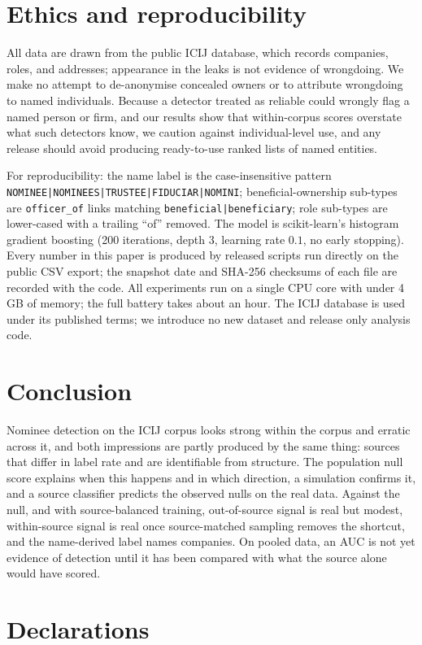 \documentclass[11pt]{article}
\begin{document}
\section{Ethics and reproducibility}
All data are drawn from the public ICIJ database, which records companies, roles,
and addresses; appearance in the leaks is not evidence of wrongdoing. We make no
attempt to de-anonymise concealed owners or to attribute wrongdoing to named
individuals. Because a detector treated as reliable could wrongly flag a named
person or firm, and our results show that within-corpus scores overstate what
such detectors know, we caution against individual-level use, and any release
should avoid producing ready-to-use ranked lists of named entities.

For reproducibility: the name label is the case-insensitive pattern
\texttt{NOMINEE|NOMINEES|TRUSTEE|FIDUCIAR|NOMINI}; beneficial-ownership sub-types
are \texttt{officer\_of} links matching \texttt{beneficial|beneficiary}; role
sub-types are lower-cased with a trailing ``of'' removed. The model is scikit-learn's
histogram gradient boosting (200 iterations, depth 3, learning rate $0.1$, no early
stopping). Every number in this paper is produced by released scripts run directly
on the public CSV export; the snapshot date and SHA-256 checksums of each file are
recorded with the code. All experiments run on a single CPU core with under 4\,GB
of memory; the full battery takes about an hour. The ICIJ database is used under
its published terms; we introduce no new dataset and release only analysis code.


\section{Conclusion}
Nominee detection on the ICIJ corpus looks strong within the corpus and erratic
across it, and both impressions are partly produced by the same thing: sources that
differ in label rate and are identifiable from structure. The population null score
explains when this happens and in which direction, a simulation confirms it, and a
source classifier predicts the observed nulls on the real data. Against the null,
and with source-balanced training, out-of-source signal is real but modest,
within-source signal is real once source-matched sampling removes the shortcut,
and the name-derived label names companies. On pooled data, an AUC is not yet
evidence of detection until it has been compared with what the source alone would
have scored.

\section*{Declarations}
\end{document}

